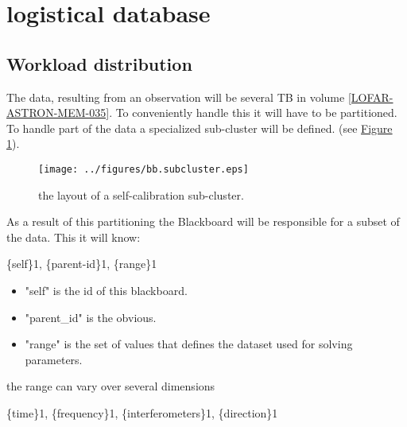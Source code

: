 \documentclass[]{lofar}
\begin{document}
  \section{logistical database}
  \label{section-logistical-datamodel}
  \hypertarget{section-logistical-datamodel}{}

    \subsection{Workload distribution}
    \label{id2721376}\hypertarget{id2721376}{}

      The data, resulting from an observation will be several TB in
      volume
      \hyperlink{LOFAR-ASTRON-MEM-035}{[LOFAR-ASTRON-MEM-035]}. To
      conveniently handle this it will have to be partitioned. To
      handle part of the data a specialized sub-cluster will be
      defined. (see \hyperlink{subcluster}{Figure 1}).

      \begin{figure}
        \texttt{[image: ../figures/bb.subcluster.eps]}
        \hypertarget{figure-bb.subcluster}{}
        \caption{the layout of a self-calibration sub-cluster.\label{figure-bb.subcluster}}
      \end{figure}

      As a result of this partitioning the Blackboard will be
      responsible for a subset of the data. This it will know:

      \{self\}1, \{parent-id\}1, \{range\}1

      \begin{itemize}

        \item 

          "self" is the id of this blackboard.

        \item 

          "parent\_id" is the obvious.

        \item 

          "range" is the set of values that defines the dataset used
          for solving parameters.

      \end{itemize}

      the range can vary over several dimensions

      \{time\}1, \{frequency\}1, \{interferometers\}1, \{direction\}1
\end{document}
